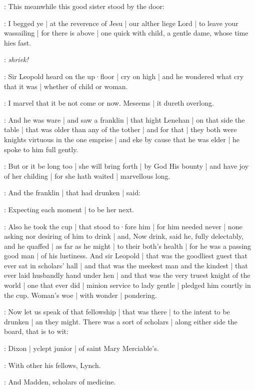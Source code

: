 :
This meanwhile this good sister stood by the door:

\nursecallan:
I begged ye |
at the reverence of Jesu |
our alther liege Lord |
to leave your wassailing |
for there is above |
one quick with child,
a gentle dame,
whose time hies fast.

\All:
\emph{shriek!}

:
Sir Leopold heard on the up·floor |
cry on high |
and he wondered what cry that it was |
whether of child or woman.

\Bloom:
I marvel that it be not come or now.
Meseems |
it dureth overlong.

:
And he was ware |
and saw a franklin |
that hight Lenehan |
on that side the table |
that was older than any of the tother |
and for that |
they both were knights virtuous in the one emprise |
and eke by cause that he was elder |
he spoke to him full gently.

\Bloom:
But or it be long too |
she will bring forth |
by God His bounty |
and have joy of her childing |
for she hath waited |
marvellous long.

:
And the franklin |
that had drunken |
said:

\lenehan:
Expecting each moment |
to be her next.

:
Also he took the cup |
that stood to·fore him |
for him needed never |
none asking nor desiring of him to drink |
and,
Now drink,
said he,
fully delectably,
and he quaffed |
as far as he might |
to their both's health |
for he was a passing good man |
of his lustiness.
And sir Leopold |
that was the goodliest guest that ever sat in scholars' hall |
and that was the meekest man and the kindest |
that ever laid husbandly hand under hen |
and that was the very truest knight of the world |
one that ever did |
minion service to lady gentle |
pledged him courtly in the cup.
Woman's woe |
with wonder |
pondering.


:
Now let us speak of that fellowship |
that was there |
to the intent to be drunken |
an they might.
There was a sort of scholars |
along either side the board,
that is to wit:

:
Dixon |
yclept junior |
of saint Mary Merciable's.

:
With other his fellows,
Lynch.

:
And Madden,
scholars of medicine.

